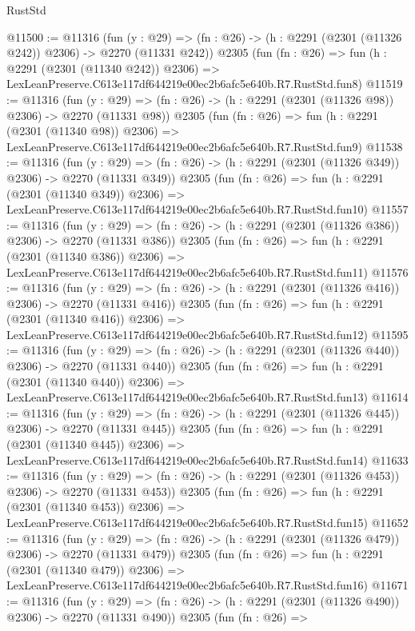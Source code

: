 \begin{lexlean}{RustStd}
\begin{coremodule}
@11500 := @11316
    (fun (y : @29) => (fn : @26) -> (h : @2291 (@2301 (@11326 @242)) @2306) -> @2270 (@11331 @242))
    @2305
    (fun (fn : @26) =>
    fun (h : @2291 (@2301 (@11340 @242)) @2306) =>
    LexLeanPreserve.C613e117df644219e00ec2b6afc5e640b.R7.RustStd.fun8)
@11519 := @11316
    (fun (y : @29) => (fn : @26) -> (h : @2291 (@2301 (@11326 @98)) @2306) -> @2270 (@11331 @98))
    @2305
    (fun (fn : @26) =>
    fun (h : @2291 (@2301 (@11340 @98)) @2306) =>
    LexLeanPreserve.C613e117df644219e00ec2b6afc5e640b.R7.RustStd.fun9)
@11538 := @11316
    (fun (y : @29) => (fn : @26) -> (h : @2291 (@2301 (@11326 @349)) @2306) -> @2270 (@11331 @349))
    @2305
    (fun (fn : @26) =>
    fun (h : @2291 (@2301 (@11340 @349)) @2306) =>
    LexLeanPreserve.C613e117df644219e00ec2b6afc5e640b.R7.RustStd.fun10)
@11557 := @11316
    (fun (y : @29) => (fn : @26) -> (h : @2291 (@2301 (@11326 @386)) @2306) -> @2270 (@11331 @386))
    @2305
    (fun (fn : @26) =>
    fun (h : @2291 (@2301 (@11340 @386)) @2306) =>
    LexLeanPreserve.C613e117df644219e00ec2b6afc5e640b.R7.RustStd.fun11)
@11576 := @11316
    (fun (y : @29) => (fn : @26) -> (h : @2291 (@2301 (@11326 @416)) @2306) -> @2270 (@11331 @416))
    @2305
    (fun (fn : @26) =>
    fun (h : @2291 (@2301 (@11340 @416)) @2306) =>
    LexLeanPreserve.C613e117df644219e00ec2b6afc5e640b.R7.RustStd.fun12)
@11595 := @11316
    (fun (y : @29) => (fn : @26) -> (h : @2291 (@2301 (@11326 @440)) @2306) -> @2270 (@11331 @440))
    @2305
    (fun (fn : @26) =>
    fun (h : @2291 (@2301 (@11340 @440)) @2306) =>
    LexLeanPreserve.C613e117df644219e00ec2b6afc5e640b.R7.RustStd.fun13)
@11614 := @11316
    (fun (y : @29) => (fn : @26) -> (h : @2291 (@2301 (@11326 @445)) @2306) -> @2270 (@11331 @445))
    @2305
    (fun (fn : @26) =>
    fun (h : @2291 (@2301 (@11340 @445)) @2306) =>
    LexLeanPreserve.C613e117df644219e00ec2b6afc5e640b.R7.RustStd.fun14)
@11633 := @11316
    (fun (y : @29) => (fn : @26) -> (h : @2291 (@2301 (@11326 @453)) @2306) -> @2270 (@11331 @453))
    @2305
    (fun (fn : @26) =>
    fun (h : @2291 (@2301 (@11340 @453)) @2306) =>
    LexLeanPreserve.C613e117df644219e00ec2b6afc5e640b.R7.RustStd.fun15)
@11652 := @11316
    (fun (y : @29) => (fn : @26) -> (h : @2291 (@2301 (@11326 @479)) @2306) -> @2270 (@11331 @479))
    @2305
    (fun (fn : @26) =>
    fun (h : @2291 (@2301 (@11340 @479)) @2306) =>
    LexLeanPreserve.C613e117df644219e00ec2b6afc5e640b.R7.RustStd.fun16)
@11671 := @11316
    (fun (y : @29) => (fn : @26) -> (h : @2291 (@2301 (@11326 @490)) @2306) -> @2270 (@11331 @490))
    @2305
    (fun (fn : @26) =>

\end{coremodule}
\end{lexlean}
